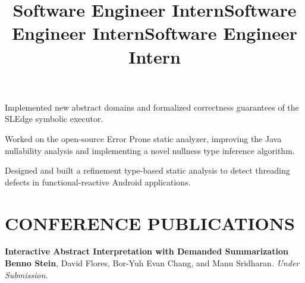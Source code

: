 \documentclass[margin]{res}
\begin{document}
\begin{resume}
\title{\textbf{Software Engineer Intern}}
\begin{position}
Implemented new abstract domains and formalized correctness guarantees of the SLEdge symbolic executor. \end{position}
\title{\textbf{Software Engineer Intern}}
\begin{position}
Worked on the open-source Error Prone static analyzer, improving the Java nullability analysis and implementing a novel nullness type inference algorithm.\end{position}
\title{\textbf{Software Engineer Intern}}
\begin{position}
Designed and built a refinement type-based static analysis to detect threading defects in functional-reactive Android applications.\end{position}


%

\section{CONFERENCE PUBLICATIONS}
{\bf Interactive Abstract Interpretation with Demanded Summarization}\\
{\bf Benno Stein}, David Flores, Bor-Yuh Evan Chang, and Manu Sridharan.  {\em Under Submission.}\\\vspace{-1em}


\end{resume}
\end{document}
